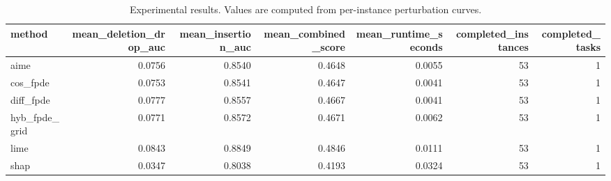 \begin{table}[t]
\caption{Experimental results. Values are computed from per-instance perturbation curves.}
\label{tab:main_results_computed}
\centering
\begin{tabular}{lrrrrrr}
\toprule
method & mean\_deletion\_drop\_auc & mean\_insertion\_auc & mean\_combined\_score & mean\_runtime\_seconds & completed\_instances & completed\_tasks \\
\midrule
aime & 0.0756 & 0.8540 & 0.4648 & 0.0055 & 53 & 1 \\
cos\_fpde & 0.0753 & 0.8541 & 0.4647 & 0.0041 & 53 & 1 \\
diff\_fpde & 0.0777 & 0.8557 & 0.4667 & 0.0041 & 53 & 1 \\
hyb\_fpde\_grid & 0.0771 & 0.8572 & 0.4671 & 0.0062 & 53 & 1 \\
lime & 0.0843 & 0.8849 & 0.4846 & 0.0111 & 53 & 1 \\
shap & 0.0347 & 0.8038 & 0.4193 & 0.0324 & 53 & 1 \\
\bottomrule
\end{tabular}

\end{table}

